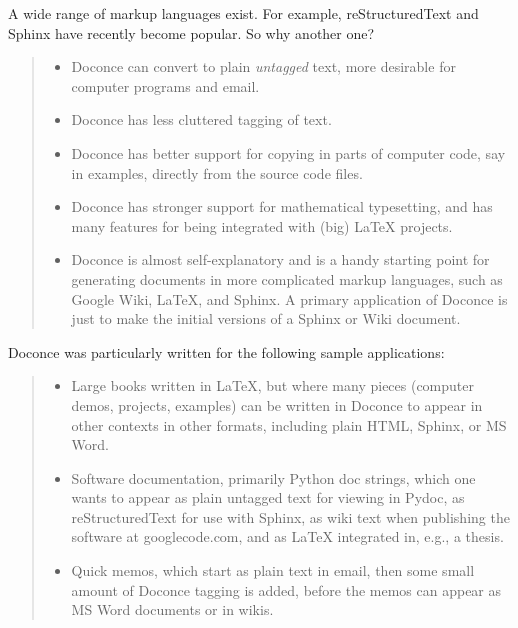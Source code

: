 \documentclass[a4paper,english]{article}
\begin{document}
A wide range of markup languages exist. For example, reStructuredText and Sphinx
have recently become popular. So why another one?
%
\begin{quote}
%
\begin{itemize}

\item Doconce can convert to plain \emph{untagged} text,
more desirable for computer programs and email.

\item Doconce has less cluttered tagging of text.

\item Doconce has better support for copying in parts of computer code,
say in examples, directly from the source code files.

\item Doconce has stronger support for mathematical typesetting, and
has many features for being integrated with (big) LaTeX projects.

\item Doconce is almost self-explanatory and is a handy starting point
for generating documents in more complicated markup languages, such
as Google Wiki, LaTeX, and Sphinx. A primary application of Doconce
is just to make the initial versions of a Sphinx or Wiki document.

\end{itemize}

\end{quote}

Doconce was particularly written for the following sample applications:
%
\begin{quote}
%
\begin{itemize}

\item Large books written in LaTeX, but where many pieces (computer demos,
projects, examples) can be written in Doconce to appear in other
contexts in other formats, including plain HTML, Sphinx, or MS Word.

\item Software documentation, primarily Python doc strings, which one wants
to appear as plain untagged text for viewing in Pydoc, as reStructuredText
for use with Sphinx, as wiki text when publishing the software at
googlecode.com, and as LaTeX integrated in, e.g., a thesis.

\item Quick memos, which start as plain text in email, then some small
amount of Doconce tagging is added, before the memos can appear as
MS Word documents or in wikis.

\end{itemize}

\end{quote}
\end{document}
